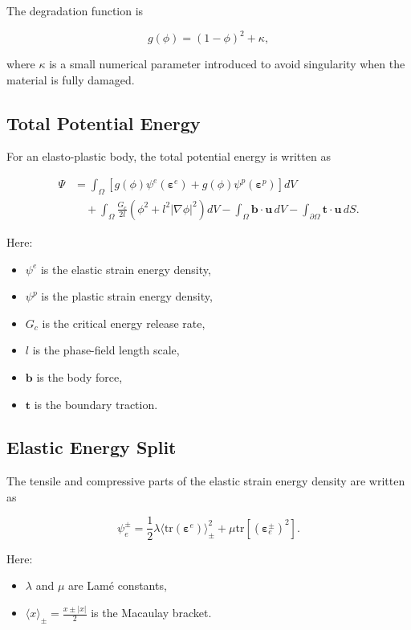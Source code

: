 ﻿\documentclass[11pt,a4paper]{article}
\begin{document}
The degradation function is

\[
g(\phi)
=
(1-\phi)^2+\kappa,
\]

where $\kappa$ is a small numerical parameter introduced to avoid singularity when the material is fully damaged.

\subsection{Total Potential Energy}

For an elasto-plastic body, the total potential energy is written as

\[
\begin{aligned}
\Psi
&=
\int_{\Omega}
\left[
g(\phi)\psi^e(\bm{\varepsilon}^e)
+
g(\phi)\psi^p(\bm{\varepsilon}^p)
\right] dV \\
&\quad
+
\int_{\Omega}
\frac{G_c}{2l}
\left(
\phi^2+l^2|\nabla \phi|^2
\right)dV
-
\int_{\Omega}
\bm{b}\cdot \bm{u}\,dV
-
\int_{\partial\Omega}
\bm{t}\cdot \bm{u}\,dS.
\end{aligned}
\]

Here:

\begin{itemize}[leftmargin=*]
    \item $\psi^e$ is the elastic strain energy density,
    \item $\psi^p$ is the plastic strain energy density,
    \item $G_c$ is the critical energy release rate,
    \item $l$ is the phase-field length scale,
    \item $\bm{b}$ is the body force,
    \item $\bm{t}$ is the boundary traction.
\end{itemize}

\subsection{Elastic Energy Split}

The tensile and compressive parts of the elastic strain energy density are written as

\[
\psi_e^{\pm}
=
\frac{1}{2}
\lambda
\langle \mathrm{tr}(\bm{\varepsilon}^e)\rangle_{\pm}^2
+
\mu
\mathrm{tr}
\left[
(\bm{\varepsilon}_e^{\pm})^2
\right].
\]

Here:

\begin{itemize}[leftmargin=*]
    \item $\lambda$ and $\mu$ are Lam\'e constants,
    \item $\langle x\rangle_{\pm} = \frac{x\pm |x|}{2}$ is the Macaulay bracket.
\end{itemize}
\end{document}
